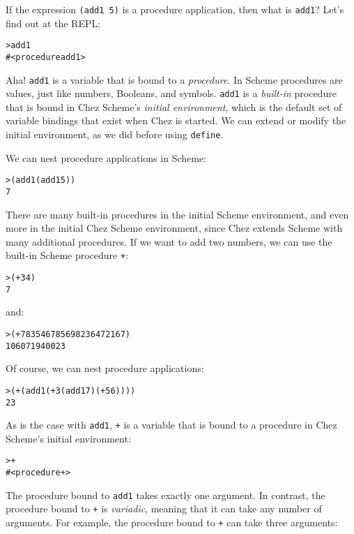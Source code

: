 \documentclass{book}
\begin{document}
If the expression \verb|(add1 5)| is a procedure application, then what is \verb|add1|?  Let's find out at the REPL:

\begin{alltt}
> add1
#<procedure add1>
\end{alltt}

Aha! 
\verb|add1| is a variable that is bound to a \emph{procedure}.
In Scheme procedures are values, just like numbers, Booleans, and symbols.
\verb|add1| is a \emph{built-in} procedure that is bound in Chez Scheme's \emph{initial environment}, which is the default set of variable bindings that exist when Chez is started.  We can extend or modify the initial environment, as we did before using \verb|define|.

We can nest procedure applications in Scheme:

\begin{alltt}
> (add1 (add1 5))
7 
\end{alltt}

There are many built-in procedures in the initial Scheme environment, and even more in the initial Chez Scheme environment, since Chez extends Scheme with many additional procedures.  If we want to add two numbers, we can use the built-in Scheme procedure \verb|+|:

\begin{alltt}
> (+ 3 4)
7
\end{alltt}

\noindent
and:

\begin{alltt}
> (+ 7835467856 98236472167)
106071940023
\end{alltt}

Of course, we can nest procedure applications:

\begin{alltt}
> (+ (add1 (+ 3 (add1 7) (+ 5 6))))
23
\end{alltt}

As is the case with \verb|add1|, \verb|+| is a variable that is bound to a procedure in Chez Scheme's initial environment:

\begin{alltt}
> +
#<procedure +>
\end{alltt}

The procedure bound to \verb|add1| takes exactly one argument.
In contrast, the procedure bound to \verb|+| is \emph{variadic}, meaning that it can take any number of arguments.  For example, the procedure bound to \verb|+| can take three arguments:
\end{document}
